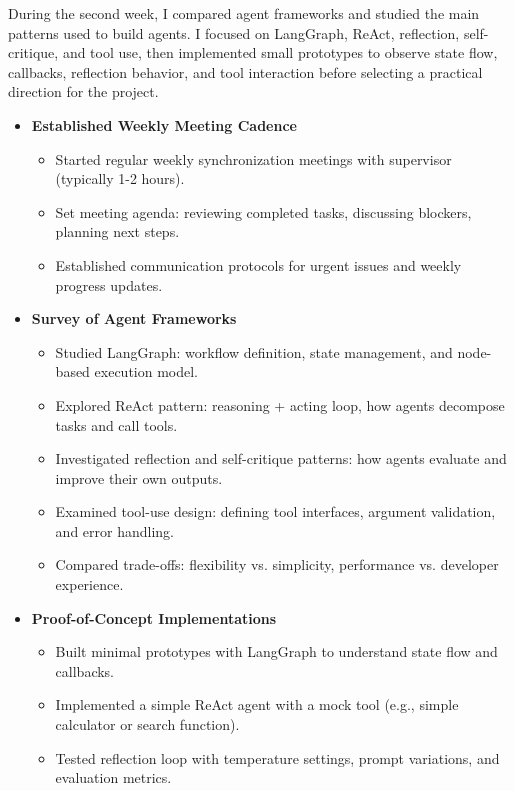 
During the second week, I compared agent frameworks and studied the main patterns used to build agents. I focused on LangGraph, ReAct, reflection, self-critique, and tool use, then implemented small prototypes to observe state flow, callbacks, reflection behavior, and tool interaction before selecting a practical direction for the project.


\begin{itemize}
    \item \textbf{Established Weekly Meeting Cadence}
    \begin{itemize}
        \item Started regular weekly synchronization meetings with supervisor (typically 1-2 hours).
        \item Set meeting agenda: reviewing completed tasks, discussing blockers, planning next steps.
        \item Established communication protocols for urgent issues and weekly progress updates.
    \end{itemize}

    \item \textbf{Survey of Agent Frameworks}
    \begin{itemize}
        \item Studied LangGraph: workflow definition, state management, and node-based execution model.
        \item Explored ReAct pattern: reasoning + acting loop, how agents decompose tasks and call tools.
        \item Investigated reflection and self-critique patterns: how agents evaluate and improve their own outputs.
        \item Examined tool-use design: defining tool interfaces, argument validation, and error handling.
        \item Compared trade-offs: flexibility vs. simplicity, performance vs. developer experience.
    \end{itemize}

    \item \textbf{Proof-of-Concept Implementations}
    \begin{itemize}
        \item Built minimal prototypes with LangGraph to understand state flow and callbacks.
        \item Implemented a simple ReAct agent with a mock tool (e.g., simple calculator or search function).
        \item Tested reflection loop with temperature settings, prompt variations, and evaluation metrics.
    \end{itemize}
\end{itemize}


